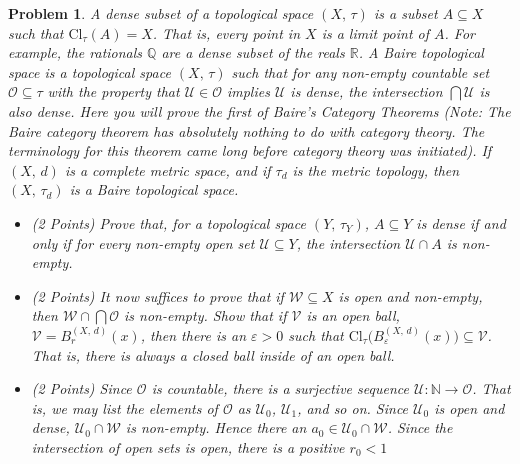 \documentclass{article}
\theoremstyle{normal}
\newtheorem{problem}{Problem}
\begin{document}
    \begin{problem}
        A dense subset of a topological space $(X,\,\tau)$ is a subset
        $A\subseteq{X}$ such that $\textrm{Cl}_{\tau}(A)=X$. That is, every
        point in $X$ is a limit point of $A$. For example, the rationals
        $\mathbb{Q}$ are a dense subset of the reals $\mathbb{R}$.
        A Baire topological space is a topological space $(X,\,\tau)$ such that
        for any non-empty countable set $\mathcal{O}\subseteq\tau$ with the
        property that $\mathcal{U}\in\mathcal{O}$ implies $\mathcal{U}$ is
        dense, the intersection $\bigcap\mathcal{U}$ is also dense. Here you
        will prove the first of Baire's Category Theorems (Note: The Baire
        category theorem has absolutely nothing to do with category theory.
        The terminology for this theorem came long before category theory was
        initiated). If $(X,\,d)$ is a complete metric space, and if
        $\tau_{d}$ is the metric topology, then $(X,\,\tau_{d})$ is a Baire
        topological space.
        \begin{itemize}
            \item (2 Points) Prove that, for a topological space
                $(Y,\,\tau_{Y})$, $A\subseteq{Y}$ is dense if and only if
                for every non-empty open set $\mathcal{U}\subseteq{Y}$, the
                intersection $\mathcal{U}\cap{A}$ is non-empty.
            \item (2 Points) It now suffices to prove that if
                $\mathcal{W}\subseteq{X}$ is open and non-empty, then
                $\mathcal{W}\cap\bigcap\mathcal{O}$ is non-empty. Show that if
                $\mathcal{V}$ is an open ball,
                $\mathcal{V}=B_{r}^{(X,\,d)}(x)$, then there is an
                $\varepsilon>0$ such that
                $\textrm{Cl}_{\tau}\big(B_{\varepsilon}^{(X,\,d)}(x)\big)\subseteq\mathcal{V}$.
                That is, there is always a \textit{closed ball} inside of an
                open ball.
            \item (2 Points) Since $\mathcal{O}$ is countable, there is a
                surjective sequence
                $\mathcal{U}:\mathbb{N}\rightarrow\mathcal{O}$. That
                is, we may list the elements of $\mathcal{O}$ as $\mathcal{U}_{0}$,
                $\mathcal{U}_{1}$, and so on. Since $\mathcal{U}_{0}$ is open
                and dense, $\mathcal{U}_{0}\cap\mathcal{W}$ is non-empty. Hence
                there an $a_{0}\in\mathcal{U}_{0}\cap\mathcal{W}$. Since the
                intersection of open sets is open, there is a positive $r_{0}<1$

\end{itemize}
\end{problem}
\end{document}
